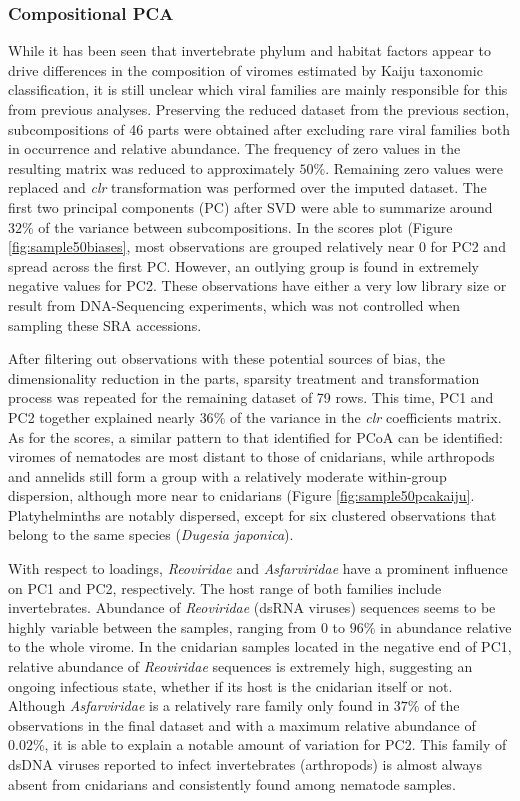 \documentclass[
  openany]{book}
\begin{document}
\hypertarget{kaijusample50}{%
\subsubsection{Compositional PCA}\label{kaijusample50}}

While it has been seen that invertebrate phylum and habitat factors appear to drive differences in the composition of viromes estimated by Kaiju taxonomic classification, it is still unclear which viral families are mainly responsible for this from previous analyses. Preserving the reduced dataset from the previous section, subcompositions of 46 parts were obtained after excluding rare viral families both in occurrence and relative abundance. The frequency of zero values in the resulting matrix was reduced to approximately \(50\%\). Remaining zero values were replaced and \emph{clr} transformation was performed over the imputed dataset. The first two principal components (PC) after SVD were able to summarize around \(32\%\) of the variance between subcompositions. In the scores plot (Figure \ref{fig:sample50biases}, most observations are grouped relatively near 0 for PC2 and spread across the first PC. However, an outlying group is found in extremely negative values for PC2. These observations have either a very low library size or result from DNA-Sequencing experiments, which was not controlled when sampling these SRA accessions.

After filtering out observations with these potential sources of bias, the dimensionality reduction in the parts, sparsity treatment and transformation process was repeated for the remaining dataset of 79 rows. This time, PC1 and PC2 together explained nearly \(36\%\) of the variance in the \emph{clr} coefficients matrix. As for the scores, a similar pattern to that identified for PCoA can be identified: viromes of nematodes are most distant to those of cnidarians, while arthropods and annelids still form a group with a relatively moderate within-group dispersion, although more near to cnidarians (Figure \ref{fig:sample50pcakaiju}. Platyhelminths are notably dispersed, except for six clustered observations that belong to the same species (\emph{Dugesia japonica}).

With respect to loadings, \emph{Reoviridae} and \emph{Asfarviridae} have a prominent influence on PC1 and PC2, respectively. The host range of both families include invertebrates. Abundance of \emph{Reoviridae} (dsRNA viruses) sequences seems to be highly variable between the samples, ranging from \(0\) to \(96\%\) in abundance relative to the whole virome. In the cnidarian samples located in the negative end of PC1, relative abundance of \emph{Reoviridae} sequences is extremely high, suggesting an ongoing infectious state, whether if its host is the cnidarian itself or not. Although \emph{Asfarviridae} is a relatively rare family only found in \(37\%\) of the observations in the final dataset and with a maximum relative abundance of \(0.02\%\), it is able to explain a notable amount of variation for PC2. This family of dsDNA viruses reported to infect invertebrates (arthropods) is almost always absent from cnidarians and consistently found among nematode samples.
\end{document}
